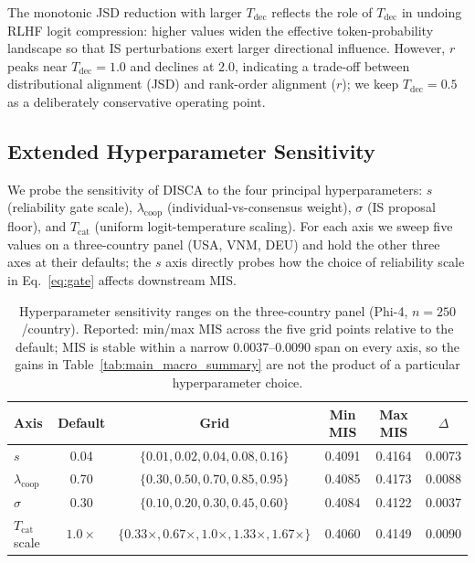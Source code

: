 \documentclass{article}
\begin{document}
The monotonic JSD reduction with larger $T_\text{dec}$ reflects the role of $T_\text{dec}$ in undoing RLHF logit compression: higher values widen the effective token-probability landscape so that IS perturbations exert larger directional influence. However, $r$ peaks near $T_\text{dec}{=}1.0$ and declines at $2.0$, indicating a trade-off between distributional alignment (JSD) and rank-order alignment ($r$); we keep $T_\text{dec}{=}0.5$ as a deliberately conservative
operating point.

\subsection{Extended Hyperparameter Sensitivity}

We probe the sensitivity of DISCA to the four principal hyperparameters: $s$ (reliability gate scale), $\lambda_{\text{coop}}$ (individual-vs-consensus weight), $\sigma$ (IS proposal floor), and $T_{\text{cat}}$ (uniform logit-temperature scaling). For each axis we sweep five values on a three-country panel (USA, VNM, DEU) and hold the other three axes at their defaults; the $s$ axis directly probes how the choice of reliability scale in Eq.~\ref{eq:gate} affects downstream MIS.

\begin{table}[H]\centering\small
\caption{Hyperparameter sensitivity ranges on the three-country panel (Phi-4, $n{=}250$/country). Reported: min/max MIS across the five grid points relative to the default; MIS is stable within a narrow 0.0037--0.0090 span on every axis, so the gains in Table~\ref{tab:main_macro_summary} are not the product of a particular hyperparameter choice.}
\label{tab:r2_hparam_sensitivity}
\setlength{\tabcolsep}{4pt}
\begin{tabular}{lccccc}\toprule
Axis & Default & Grid & Min MIS & Max MIS & $\Delta$ \\\midrule
$s$                    & 0.04 & $\{0.01, 0.02, 0.04, 0.08, 0.16\}$ & 0.4091 & 0.4164 & 0.0073 \\
$\lambda_{\text{coop}}$ & 0.70 & $\{0.30, 0.50, 0.70, 0.85, 0.95\}$ & 0.4085 & 0.4173 & 0.0088 \\
$\sigma$               & 0.30 & $\{0.10, 0.20, 0.30, 0.45, 0.60\}$ & 0.4084 & 0.4122 & 0.0037 \\
$T_{\text{cat}}$ scale & $1.0\times$ & $\{0.33\times, 0.67\times, 1.0\times, 1.33\times, 1.67\times\}$ & 0.4060 & 0.4149 & 0.0090 \\\bottomrule
\end{tabular}\end{table}
\end{document}
